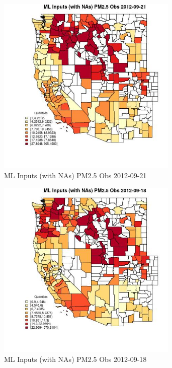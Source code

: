 
\clearpage 

\begin{figure} 
\centering  
\includegraphics[width=0.77\textwidth]{Code_Outputs/Report_ML_input_PM25_Step4_part_e_de_duplicated_aves_compiled_2019-05-14wNAs_CountyPM25_ObsMean2012-09-21_2012-09-21.jpg} 
\caption{\label{fig:Report_ML_input_PM25_Step4_part_e_de_duplicated_aves_compiled_2019-05-14wNAsCountyPM25_ObsMean2012-09-21_2012-09-21}ML Inputs (with NAs) PM2.5 Obs 2012-09-21} 
\end{figure} 
 

\begin{figure} 
\centering  
\includegraphics[width=0.77\textwidth]{Code_Outputs/Report_ML_input_PM25_Step4_part_e_de_duplicated_aves_compiled_2019-05-14wNAs_CountyPM25_ObsMean2012-09-18_2012-09-18.jpg} 
\caption{\label{fig:Report_ML_input_PM25_Step4_part_e_de_duplicated_aves_compiled_2019-05-14wNAsCountyPM25_ObsMean2012-09-18_2012-09-18}ML Inputs (with NAs) PM2.5 Obs 2012-09-18} 
\end{figure} 
 

